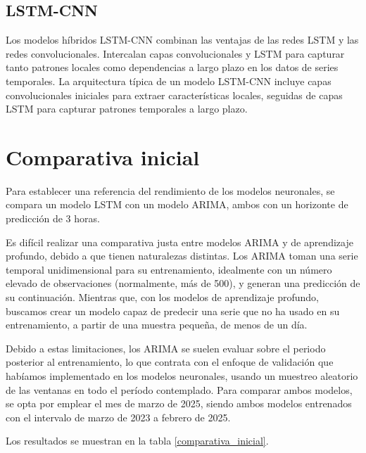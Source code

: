 \subsection{LSTM-CNN}
Los modelos híbridos LSTM-CNN combinan las ventajas de las redes LSTM y las redes convolucionales. Intercalan capas convolucionales y LSTM para capturar tanto patrones locales como dependencias a largo plazo en los datos de series temporales.
La arquitectura típica de un modelo LSTM-CNN incluye capas convolucionales iniciales para extraer características locales, seguidas de capas LSTM para capturar patrones temporales a largo plazo.

\section{Comparativa inicial}
Para establecer una referencia del rendimiento de los modelos neuronales, se compara un modelo LSTM con un modelo ARIMA, ambos con un horizonte de predicción de 3 horas.

Es difícil realizar una comparativa justa entre modelos ARIMA y de aprendizaje profundo, debido a que tienen naturalezas distintas.
Los ARIMA toman una serie temporal unidimensional para su entrenamiento, idealmente con un número elevado de observaciones (normalmente, más de 500),
 y generan una predicción de su continuación. Mientras que, con los modelos de aprendizaje profundo, buscamos crear un modelo capaz de predecir
una serie que no ha usado en su entrenamiento, a partir de una muestra pequeña, de menos de un día.  


Debido a estas limitaciones, los ARIMA se suelen evaluar sobre el periodo posterior al entrenamiento, lo que contrata con el enfoque de validación que habíamos implementado 
en los modelos neuronales, usando un muestreo aleatorio de las ventanas en todo el período contemplado.
Para comparar ambos modelos, se opta por emplear el mes de marzo de 2025, siendo ambos modelos entrenados con el intervalo de marzo de 2023 a febrero de 2025.  


Los resultados se muestran en la tabla \ref{comparativa_inicial}.

